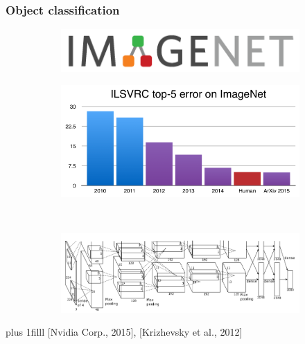 \documentclass{beamer}
\newcommand{\source}[1]{\vskip0pt plus 1filll \scriptsize #1}
\begin{document}
\begin{frame}
	\end{frame}
		
	\begin{frame}
		\frametitle{Object classification}
		\vspace{30pt}
		\begin{figure}[h]
			\centering
			\begin{subfigure}{\textwidth}
				\includegraphics[width=\textwidth]{plots/imageNetLogo.png}
			\end{subfigure}
			\par\smallskip
			\begin{subfigure}{0.35\textwidth}
				\includegraphics[width=\textwidth]{plots/imageNetAdvances.png}
			\end{subfigure}
			~
			\begin{subfigure}{0.6\textwidth}
				\includegraphics[width=\textwidth]{plots/alexnet.png}
			\end{subfigure}
		\end{figure}
		\source{[Nvidia Corp., 2015], [Krizhevsky et al., 2012]}
	\end{frame}
	
\end{document}
